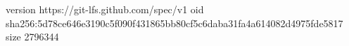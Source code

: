 version https://git-lfs.github.com/spec/v1
oid sha256:5d78ce646e3190c5f090f431865bb80cf5c6daba31fa4a614082d4975fde5817
size 2796344
